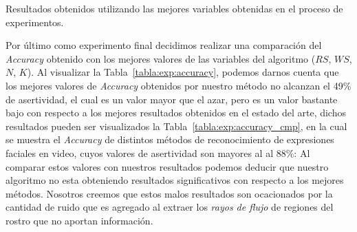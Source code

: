 \begin{table}[bt]
	\centering
	\caption{Resultados obtenidos utilizando las mejores variables obtenidas en el proceso de experimentos.}
	\label{tabla:exp:accuracy}
\end{table}


Por último como experimento final decidimos realizar una comparación del \textit{Accuracy} obtenido con los mejores valores de las variables del algoritmo ($RS$, $WS$, $N$, $K$). Al visualizar la Tabla~\ref{tabla:exp:accuracy}, podemos darnos cuenta que los mejores valores de  \textit{Accuracy} obtenidos por nuestro método no alcanzan el 49\% de asertividad, el cual es un valor mayor que el azar, pero es un valor bastante bajo con respecto a los mejores resultados obtenidos en el estado del arte, dichos resultados pueden ser visualizados la Tabla~\ref{tabla:exp:accuracy_cmp}, en la cual se muestra el \textit{Accuracy} de distintos métodos de reconocimiento de expresiones faciales en video, cuyos valores de asertividad son mayores al al 88\%: Al comparar estos valores con nuestros resultados podemos deducir que nuestro algoritmo no esta obteniendo resultados significativos con respecto a los mejores métodos. Nosotros creemos que estos malos resultados son ocacionados por la cantidad de ruido que es agregado al extraer los \textit{rayos de flujo} de regiones del rostro que no aportan información. 



